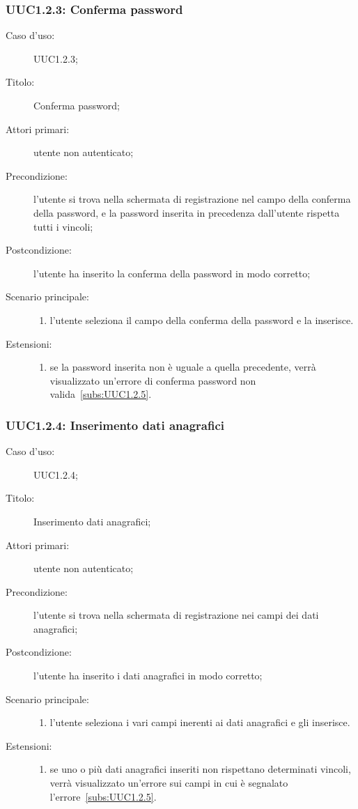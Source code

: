 \documentclass[../../../analisi-dei-requisiti.tex]{subfiles}
\begin{document}
\subsubsection{UUC1.2.3: Conferma password}%
\label{subs:UUC1.2.3}
\begin{description}
  \item[Caso d’uso:] UUC1.2.3;
  \item[Titolo:] Conferma password;
  \item[Attori primari:] utente non autenticato;
  \item[Precondizione:] l'utente si trova nella schermata di registrazione nel campo della conferma della password,
        e la password inserita in precedenza dall'utente rispetta tutti i vincoli;
  \item[Postcondizione:] l'utente ha inserito la conferma della password in modo corretto;
  \item[Scenario principale:]
  \begin{enumerate}
    \item l'utente seleziona il campo della conferma della password e la inserisce.
  \end{enumerate}
  \item[Estensioni:]
  \begin{enumerate}
    \item se la password inserita non è uguale a quella precedente, verrà visualizzato un'errore di conferma password non valida~\ref{subs:UUC1.2.5}.
  \end{enumerate}
\end{description}



\subsubsection{UUC1.2.4: Inserimento dati anagrafici}%
\label{subs:UUC1.2.4}
\begin{description}
  \item[Caso d’uso:] UUC1.2.4;
  \item[Titolo:] Inserimento dati anagrafici;
  \item[Attori primari:] utente non autenticato;
  \item[Precondizione:] l'utente si trova nella schermata di registrazione nei campi dei dati anagrafici;
  \item[Postcondizione:] l'utente ha inserito i dati anagrafici in modo corretto;
  \item[Scenario principale:]
  \begin{enumerate}
    \item l'utente seleziona i vari campi inerenti ai dati anagrafici e gli inserisce.
  \end{enumerate}
  \item[Estensioni:]
  \begin{enumerate}
    \item se uno o più dati anagrafici inseriti non rispettano determinati vincoli, verrà visualizzato un'errore sui campi in cui è segnalato l'errore~\ref{subs:UUC1.2.5}.
  \end{enumerate}
\end{description}
\end{document}
